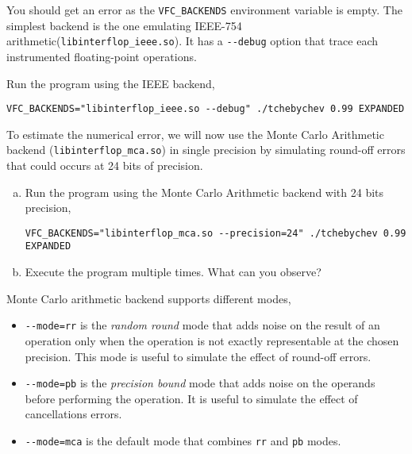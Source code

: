 You should get an error as the \texttt{VFC\_BACKENDS} environment variable is empty.
The simplest backend is the one emulating IEEE-754 arithmetic(\texttt{libinterflop\_ieee.so}). 
It has a \texttt{-{}-debug} option that trace each instrumented floating-point operations.

\begin{question}
Run the program using the IEEE backend,
\begin{verbatim}
VFC_BACKENDS="libinterflop_ieee.so --debug" ./tchebychev 0.99 EXPANDED
\end{verbatim}
\end{question}

To estimate the numerical error, we will now use the Monte Carlo Arithmetic backend
(\texttt{libinterflop\_mca.so}) in single precision by simulating round-off errors that could occurs at 24 bits of precision.

\begin{question}
  \begin{enumerate}[(a)]
  \item Run the program using the Monte Carlo Arithmetic backend with 24 bits precision,
\begin{verbatim}
VFC_BACKENDS="libinterflop_mca.so --precision=24" ./tchebychev 0.99 EXPANDED
\end{verbatim}
  \item Execute the program multiple times. What can you observe?
  \end{enumerate}
\end{question}

Monte Carlo arithmetic backend supports different modes,
\begin{itemize}

  \item \texttt{-{}-mode=rr} is the \emph{random round} mode that adds noise on the
    result of an operation only when the operation is not exactly representable
    at the chosen precision. This mode is useful to simulate the effect of
    round-off errors.

  \item \texttt{-{}-mode=pb} is the \emph{precision bound} mode that adds noise on
  the operands before performing the operation. It is useful to simulate the
    effect of cancellations errors.

  \item \texttt{-{}-mode=mca} is the default mode that combines \texttt{rr} and
  \texttt{pb} modes.

\end{itemize}

